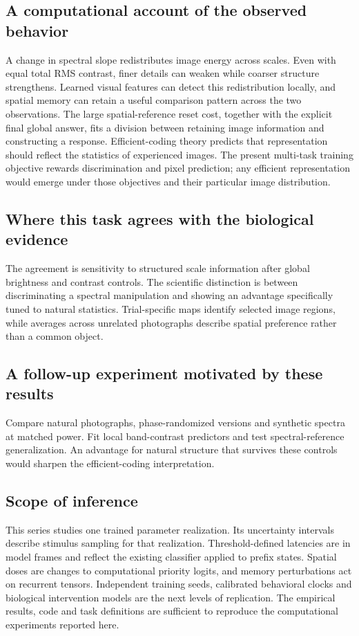 \documentclass[11pt]{article}
\begin{document}
\subsection{A computational account of the observed behavior}
A change in spectral slope redistributes image energy across scales. Even with equal total RMS contrast, finer details can weaken while coarser structure strengthens. Learned visual features can detect this redistribution locally, and spatial memory can retain a useful comparison pattern across the two observations. The large spatial-reference reset cost, together with the explicit final global answer, fits a division between retaining image information and constructing a response. Efficient-coding theory predicts that representation should reflect the statistics of experienced images. The present multi-task training objective rewards discrimination and pixel prediction; any efficient representation would emerge under those objectives and their particular image distribution.

\subsection{Where this task agrees with the biological evidence}
The agreement is sensitivity to structured scale information after global brightness and contrast controls. The scientific distinction is between discriminating a spectral manipulation and showing an advantage specifically tuned to natural statistics. Trial-specific maps identify selected image regions, while averages across unrelated photographs describe spatial preference rather than a common object.

\subsection{A follow-up experiment motivated by these results}
Compare natural photographs, phase-randomized versions and synthetic spectra at matched power. Fit local band-contrast predictors and test spectral-reference generalization. An advantage for natural structure that survives these controls would sharpen the efficient-coding interpretation.
\subsection{Scope of inference}
This series studies one trained parameter realization. Its uncertainty intervals describe stimulus sampling for that realization. Threshold-defined latencies are in model frames and reflect the existing classifier applied to prefix states. Spatial doses are changes to computational priority logits, and memory perturbations act on recurrent tensors. Independent training seeds, calibrated behavioral clocks and biological intervention models are the next levels of replication. The empirical results, code and task definitions are sufficient to reproduce the computational experiments reported here.
\end{document}

